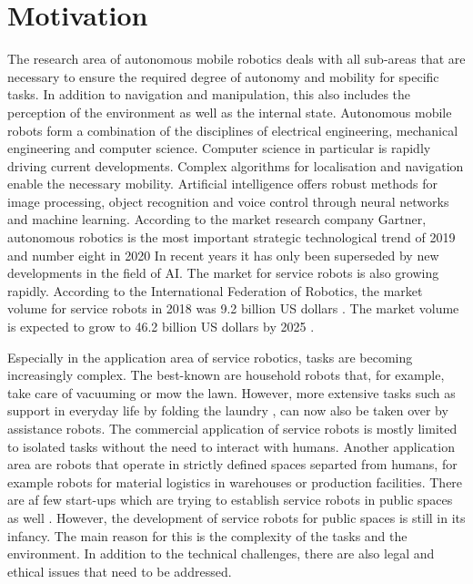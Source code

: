 \section{Motivation}
\label{sec:motivation}
The research area of autonomous mobile robotics deals with all sub-areas that are necessary to ensure the required degree of autonomy and mobility for specific tasks. In addition to navigation and manipulation, this also includes the perception of the environment as well as the internal state. Autonomous mobile robots form a combination of the disciplines of electrical engineering, mechanical engineering and computer science. Computer science in particular is rapidly driving current developments. Complex algorithms for localisation and navigation enable the necessary mobility. Artificial intelligence offers robust methods for image processing, object recognition and voice control through neural networks and machine learning.  According to the market research company Gartner, autonomous robotics is the most important strategic technological trend of 2019 \cite{Cearley.2018} and number eight in 2020  In recent years it has only been superseded by new developments in the field of AI. The market for service robots is also growing rapidly.  According to the International Federation of Robotics, the market volume for service robots in 2018 was 9.2 billion US dollars \cite{InternationalFederationofRobotics.2019}. The market volume is expected to grow to 46.2 billion US dollars by 2025 \cite{InternationalFederationofRobotics.2019}.

Especially in the application area of service robotics, tasks are becoming increasingly complex. The best-known are household robots that, for example, take care of vacuuming or mow the lawn. However, more extensive tasks such as support in everyday life by folding the laundry , can now also be taken over by assistance robots. The commercial application of service robots is mostly limited to isolated tasks without the need to interact with humans. Another application area are robots that operate in strictly defined spaces separted from humans, for example robots for material logistics in warehouses or production facilities. There are af few start-ups which are trying to establish service robots in public spaces as well . However, the development of service robots for public spaces is still in its infancy. The main reason for this is the complexity of the tasks and the environment. In addition to the technical challenges, there are also legal and ethical issues that need to be addressed.

